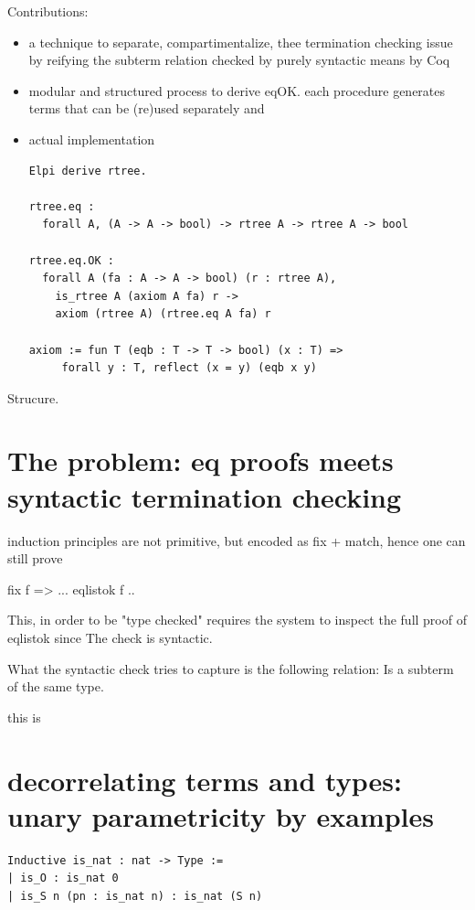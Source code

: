 \documentclass[sigplan,10pt,review]{acmart}\settopmatter{printfolios=true,printccs=false,printacmref=false}
\begin{document}
Contributions:
\begin{itemize}
\item a technique to separate, compartimentalize, thee termination checking
	issue by reifying the subterm relation checked by purely syntactic
	means by Coq

\item modular and structured process to derive eqOK. each procedure generates
	terms that can be (re)used separately and

\item actual implementation 
\begin{lstlisting}
Elpi derive rtree.

rtree.eq :
  forall A, (A -> A -> bool) -> rtree A -> rtree A -> bool

rtree.eq.OK :
  forall A (fa : A -> A -> bool) (r : rtree A),
    is_rtree A (axiom A fa) r ->
    axiom (rtree A) (rtree.eq A fa) r

axiom := fun T (eqb : T -> T -> bool) (x : T) =>
     forall y : T, reflect (x = y) (eqb x y)
\end{lstlisting}
\end{itemize}

Strucure.

\section{The problem: eq proofs meets syntactic termination checking}

induction principles are not primitive, but encoded as fix + match, hence one
can still prove

fix f => ... eqlistok f ..

This, in order to be "type checked" requires the system to inspect the
full proof of eqlistok since The check is syntactic.

What the syntactic check tries to capture is the following relation:
Is a subterm of the same type.

this is 

\section{decorrelating terms and types: unary parametricity by examples}

\begin{lstlisting}
Inductive is_nat : nat -> Type :=
| is_O : is_nat 0
| is_S n (pn : is_nat n) : is_nat (S n)
\end{lstlisting}
\end{document}
